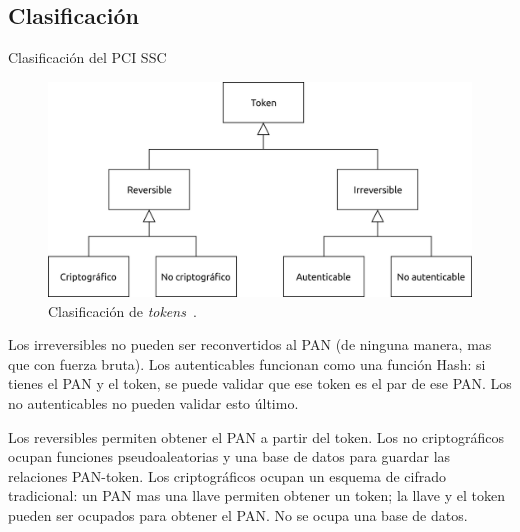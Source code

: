 %
%
%

\subsection{Clasificación}

\begin{frame}{Clasificación del PCI SSC}

  \begin{figure}[H]
    \begin{center}
      \includegraphics[width=1.0\linewidth]
        {../../../diagramas_comunes/clasificacion/clasificacion.png}
      \caption{Clasificación de \textit{tokens}~\cite{pci_tokens}.}
    \end{center}
  \end{figure}

  \note
  {
    Los irreversibles no pueden ser reconvertidos al PAN (de ninguna manera,
    mas que con fuerza bruta). Los autenticables funcionan como una función
    Hash: si tienes el PAN y el token, se puede validar que ese token es el
    par de ese PAN. Los no autenticables no pueden validar esto último.

    Los reversibles permiten obtener el PAN a partir del token. Los no
    criptográficos ocupan funciones pseudoaleatorias y una base de datos
    para guardar las relaciones PAN-token. Los criptográficos ocupan un
    esquema de cifrado tradicional: un PAN mas una llave permiten obtener
    un token; la llave y el token pueden ser ocupados para obtener el PAN. No
    se ocupa una base de datos.
  }

\end{frame}

